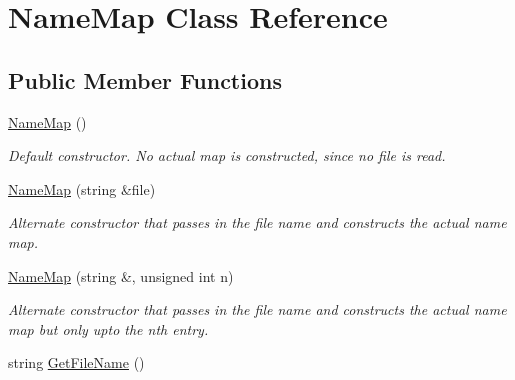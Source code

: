 \hypertarget{class_name_map}{
\section{NameMap Class Reference}
\label{class_name_map}
}
\subsection*{Public Member Functions}
\begin{DoxyCompactItemize}
\item 
\hypertarget{class_name_map_a8560d4570112d839b90be032f2af34e7}{
\hyperlink{class_name_map_a8560d4570112d839b90be032f2af34e7}{NameMap} ()}
\label{class_name_map_a8560d4570112d839b90be032f2af34e7}

\begin{DoxyCompactList}\small\item\em Default constructor. No actual map is constructed, since no file is read. \item\end{DoxyCompactList}\item 
\hypertarget{class_name_map_a65b751a2cf738a2d391aca986d5f5281}{
\hyperlink{class_name_map_a65b751a2cf738a2d391aca986d5f5281}{NameMap} (string \&file)}
\label{class_name_map_a65b751a2cf738a2d391aca986d5f5281}

\begin{DoxyCompactList}\small\item\em Alternate constructor that passes in the file name and constructs the actual name map. \item\end{DoxyCompactList}\item 
\hypertarget{class_name_map_ac9380cbc347a59d04732860ba3c069cd}{
\hyperlink{class_name_map_ac9380cbc347a59d04732860ba3c069cd}{NameMap} (string \&, unsigned int n)}
\label{class_name_map_ac9380cbc347a59d04732860ba3c069cd}

\begin{DoxyCompactList}\small\item\em Alternate constructor that passes in the file name and constructs the actual name map but only upto the nth entry. \item\end{DoxyCompactList}\item 
\hypertarget{class_name_map_a9b58a913f6abdda24ead4f56c36a75d4}{
string \hyperlink{class_name_map_a9b58a913f6abdda24ead4f56c36a75d4}{GetFileName} ()}
\label{class_name_map_a9b58a913f6abdda24ead4f56c36a75d4}


\end{DoxyCompactItemize}
